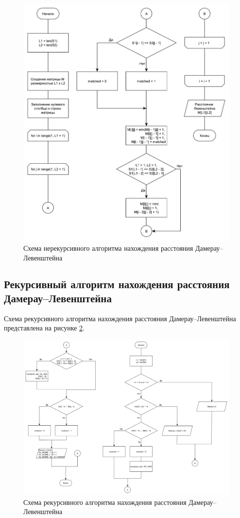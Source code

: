 \begin{figure}[h]
	\centering
	\includegraphics[scale=0.6]{images/dlev.pdf}
	\caption{Схема нерекурсивного алгоритма нахождения расстояния Дамерау--Левенштейна}
	\label{img:dlev}
\end{figure}


\subsection{Рекурсивный алгоритм нахождения расстояния Дамерау--Левенштейна}

Схема рекурсивного алгоритма нахождения расстояния Дамерау--Левенштейна представлена на рисунке \ref{img:dlev_req}.

\begin{figure}[h]
	\centering
	\includegraphics[scale=0.45]{images/dlev_req.pdf}
	\caption{Схема рекурсивного алгоритма нахождения расстояния Дамерау--Левенштейна}
	\label{img:dlev_req}
\end{figure}


